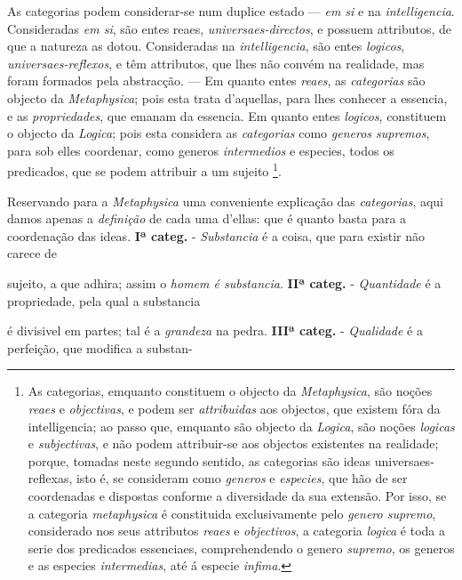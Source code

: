 
As categorias podem considerar-se num duplice estado --- \emph{em si} e na \emph{intelligencia}. Consideradas \emph{em si}, são entes reaes, \emph{universaes-directos},   e possuem attributos, de que a natureza as dotou. Consideradas na \emph{intelligencia}, são entes \emph{logicos}, \emph{universaes-reflexos}, e têm attributos, que lhes não convém na realidade, mas foram formados pela abstracção. --- Em quanto entes \emph{reaes}, as \emph{categorias} são objecto da \emph{Metaphysica}; pois esta trata d'aquellas, para lhes   conhecer a essencia, e as \emph{propriedades}, que emanam da essencia. Em quanto entes \emph{logicos}, constituem o objecto da \emph{Logica}; pois esta considera as \emph{categorias} como \emph{generos supremos}, para sob elles coordenar, como generos \emph{intermedios} e especies, todos os predicados, que se podem attribuir a um sujeito \footnote{As categorias, emquanto constituem o objecto da \emph{Metaphysica}, são noções \emph{reaes} e \emph{objectivas}, e podem ser \emph{attribuidas} aos objectos, que existem fóra da intelligencia; ao passo que, emquanto são objecto da \emph{Logica}, são noções \emph{logicas} e \emph{subjectivas}, e não podem attribuir-se aos objectos existentes na realidade; porque, tomadas neste segundo sentido, as categorias são ideas universaes-reflexas, isto é, se consideram como \emph{generos} e \emph{especies}, que hão de ser coordenadas e dispostas conforme a diversidade da sua extensão. Por isso, se a categoria \emph{metaphysica} é constituida exclusivamente pelo \emph{genero supremo}, considerado nos seus attributos \emph{reaes} e \emph{objectivos}, a categoria \emph{logica} é toda a serie dos predicados essenciaes, comprehendendo o genero \emph{supremo}, os generos e as especies \emph{intermedias}, até á especie \emph{infima}.}.


Reservando para a \emph{Metaphysica} uma conveniente explicação das \emph{categorias}, aqui damos apenas a \emph{definição} de cada uma d'ellas: que é quanto basta para a coordenação das ideas. \textbf{Iª categ.} - \emph{Substancia} é a coisa, que para existir não carece de

sujeito, a que adhira; assim o \emph{homem é substancia}. \textbf{IIª categ.} - \emph{Quantidade} é a propriedade, pela qual a substancia

é divisivel em partes; tal é a \emph{grandeza} na pedra. \textbf{IIIª categ.} - \emph{Qualidade} é a perfeição, que modifica a substan-

